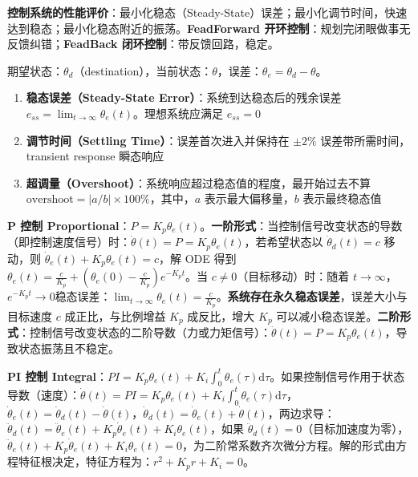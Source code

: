 \documentclass[
  8pt]{extarticle}
\begin{document}
\begin{multicols*}{4}
\textbf{控制系统的性能评价}：最小化稳态（Steady-State）误差；最小化调节时间，快速达到稳态；最小化稳态附近的振荡。\textbf{FeadForward
开环控制}：规划完闭眼做事无反馈纠错；\textbf{FeadBack
闭环控制}：带反馈回路，稳定。

期望状态：\(\theta_d\)（destination），当前状态：\(\theta\)，误差：\(\theta_e = \theta_d - \theta\)。

\begin{enumerate}
\def\labelenumi{\arabic{enumi}.}
\item
  \textbf{稳态误差（Steady-State Error）}：系统到达稳态后的残余误差
  \(e_{ss} = \lim_{t\to\infty} \theta_e(t)\)。理想系统应满足
  \(e_{ss}=0\)
\item
  \textbf{调节时间（Settling Time）}：误差首次进入并保持在 \(\pm 2\%\)
  误差带所需时间，transient response 瞬态响应
\item
  \textbf{超调量（Overshoot）}：系统响应超过稳态值的程度，最开始过去不算
  \(\text{overshoot} = |a/b| \times 100\%\)，其中，\(a\)
  表示最大偏移量，\(b\) 表示最终稳态值
\end{enumerate}

\textbf{P 控制
Proportional}：\(P = K_p\theta_e(t)\)。\textbf{一阶形式}：当控制信号改变状态的导数（即控制速度信号）时：\(\dot{\theta}(t) = P = K_p\theta_e(t)\)，若希望状态以
\(\dot{\theta}_d(t) = c\) 移动，则
\(\dot{\theta}_e(t) + K_p\theta_e(t) = c\)，解 ODE 得到
\(\theta_e(t) = \frac{c}{K_p} + \left(\theta_e(0) - \frac{c}{K_p}\right)e^{-K_pt}\)。当
\(c\neq0\)（目标移动）时：随着
\(t\rightarrow\infty\)，\(e^{-K_pt}\rightarrow0\)稳态误差：\(\lim_{t\rightarrow\infty}\theta_e(t) = \frac{c}{K_p}\)。\textbf{系统存在永久稳态误差}，误差大小与目标速度
\(c\) 成正比，与比例增益 \(K_p\) 成反比，增大 \(K_p\)
可以减小稳态误差。\textbf{二阶形式}：控制信号改变状态的二阶导数（力或力矩信号）：\(\ddot{\theta}(t) = P = K_p\theta_e(t)\)，导致状态振荡且不稳定。

\textbf{PI 控制
Integral}：\(PI = K_p \theta_e(t) + K_i \int_0^t \theta_e(\tau) \mathrm{d}\tau\)。如果控制信号作用于状态导数（速度）：\(\dot{\theta}(t) = PI = K_p \theta_e(t) + K_i \int_0^t \theta_e(\tau) \mathrm{d}\tau\)，\(\dot{\theta}_e(t) = \dot{\theta}_d(t) - \dot{\theta}(t)\)，\(\dot{\theta}_d(t) = \dot{\theta}_e(t) + \dot{\theta}(t)\)，两边求导：\(\ddot{\theta}_d(t) = \ddot{\theta}_e(t) + K_p \dot{\theta}_e(t) + K_i \theta_e(t)\)，如果
\(\ddot{\theta}_d(t) = 0\)（目标加速度为零），\(\ddot{\theta}_e(t) + K_p \dot{\theta}_e(t) + K_i \theta_e(t) = 0\)，为二阶常系数齐次微分方程。解的形式由方程特征根决定，特征方程为：\(r^2 + K_p r + K_i = 0\)。


\end{multicols*}
\end{document}
